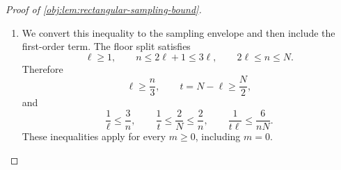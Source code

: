 \begin{proof}[Proof of \cref{obj:lem:rectangular-sampling-bound}]
\begin{enumerate}
To compute the rectangular second moment, recall the independent-sample identity. For \(n_{\mathrm{av}}\ge1\) independent identically distributed square-integrable real variables \(Z_{\mathrm{av},j}\), define
\[
\overline Z_{\mathrm{av}}
=\frac1{n_{\mathrm{av}}}
 \sum_{j=1}^{n_{\mathrm{av}}}Z_{\mathrm{av},j}.
\]
Expanding the square and factoring the mixed expectations gives
\[
\mathbb E\,\overline Z_{\mathrm{av}}^2
=\frac1{n_{\mathrm{av}}}\mathbb E Z_{\mathrm{av},1}^2
 +\left(1-\frac1{n_{\mathrm{av}}}\right)
   (\mathbb E Z_{\mathrm{av},1})^2.
\]
Apply this identity first to the outcome-record average, with the treatment records fixed, and then to the treatment-record averages. Finite-sum integration commutes with taking the slice means. Since \(H_{\diamond,0}\) has mean zero, the resulting identity is
\[
\begin{aligned}
\mathbb E(\widehat H_\diamond-\mu_\diamond)^2
&=\frac{\mathbb E H_{\diamond,0}^2}{t\ell}\\
&\quad+\frac1t\left(1-\frac1\ell\right)
       \mathbb E H_{\diamond,1}^2\\
&\quad+\left(1-\frac1t\right)\frac1\ell
       \mathbb E H_{\diamond,2}^2.
\end{aligned}
\]
Substituting the residual-energy identity above reduces this to
\[
\mathbb E(\widehat H_\diamond-\mu_\diamond)^2
=\frac{\mathbb E H_{\diamond,1}^2}{t}
 +\frac{\mathbb E H_{\diamond,2}^2}{\ell}
 +\frac{\mathbb E H_{\diamond,12}^2}{t\ell}.
\]
The three preceding energy comparisons imply
\[
\mathbb E(\widehat H_\diamond-\mu_\diamond)^2
\le
\frac{\mathbb E H_{\diamond,T}^2}{t}
+\frac{\mathbb E H_{\diamond,L}^2}{\ell}
+\frac{\mathbb E H_\diamond^2}{t\ell}.
\]

\item We convert this inequality to the sampling envelope and then include the first-order term. The floor split satisfies
\[
\ell\ge1,\qquad n\le2\ell+1\le3\ell,
\qquad 2\ell\le n\le N.
\]
Therefore
\[
\ell\ge\frac n3,\qquad
t=N-\ell\ge\frac N2,
\]
and
\[
\frac1\ell\le\frac3n,\qquad
\frac1t\le\frac2N\le\frac2n,\qquad
\frac1{t\ell}\le\frac6{nN}.
\]
These inequalities apply for every \(m\ge0\), including \(m=0\).


\end{enumerate}
\end{proof}
